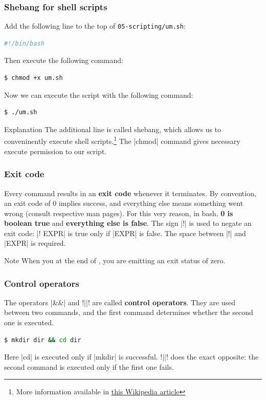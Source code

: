 \begin{frame}[fragile]
\frametitle{Shebang for shell scripts}
Add the following line to the top of \texttt{05-scripting/um.sh}:
\begin{lstlisting}[language=bash]
#!/bin/bash
\end{lstlisting}
Then execute the following command:
\begin{lstlisting}[language=bash]
$ chmod +x um.sh
\end{lstlisting}
Now we can execute the script with the following command:
\begin{lstlisting}[language=bash]
$ ./um.sh
\end{lstlisting}
\begin{block}{Explanation}
The additional line is called shebang, which allows us to conveninently execute
shell scripts.\footnote{More information available in
\href{https://en.wikipedia.org/wiki/Shebang_(Unix)}{this Wikipedia article}}
The \cverb|chmod| command gives necessary execute permission to
our script.
\end{block}
\end{frame}


\begin{frame}[fragile]
\frametitle{Exit code}
Every command results in an \textbf{exit code} whenever it terminates.
By convention, an exit code of 0 implies success, and everything else means
something went wrong (consult respective man pages).
\newline \newline
For this very reason, in bash, \textbf{0 is boolean true} and
\textbf{everything else is false}.
\newline \newline
The sign \cverb|!| is used to negate an exit code: \cverb|! EXPR| is true only
if \cverb|EXPR| is false. The space between \cverb|!| and \cverb|EXPR| is
required.

\begin{block}{Note}
    When you  at the end of , you are
    emitting an exit status of zero.
\end{block}
\end{frame}

\begin{frame}[fragile]
\frametitle{Control operators}

The operators \cverb|&&| and \cverb!||! are called \textbf{control operators}.
They are used between two commands, and the first command determines
whether the second one is executed.
\begin{lstlisting}[language=bash]
$ mkdir dir && cd dir
\end{lstlisting}
Here \cverb|cd| is executed only if \cverb|mkdir| is successful. \cverb!||!
does the exact opposite: the second command is executed only if the first one
fails.
\end{frame}

